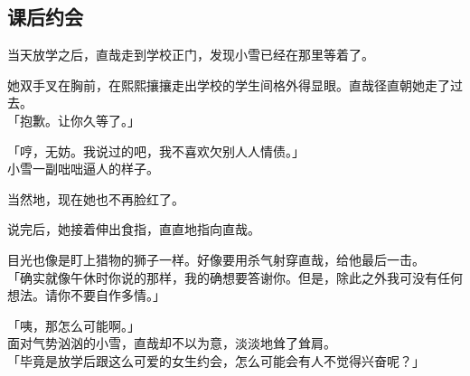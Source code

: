 \subsection{课后约会}

当天放学之后，直哉走到学校正门，发现小雪已经在那里等着了。

她双手叉在胸前，在熙熙攘攘走出学校的学生间格外得显眼。直哉径直朝她走了过去。\\

「抱歉。让你久等了。」

「哼，无妨。我说过的吧，我不喜欢欠别人人情债。」\\

小雪一副咄咄逼人的样子。

当然地，现在她也不再脸红了。

说完后，她接着伸出食指，直直地指向直哉。

目光也像是盯上猎物的狮子一样。好像要用杀气射穿直哉，给他最后一击。\\

「确实就像午休时你说的那样，我的确想要答谢你。但是，除此之外我可没有任何想法。请你不要自作多情。」

「咦，那怎么可能啊。」\\

面对气势汹汹的小雪，直哉却不以为意，淡淡地耸了耸肩。\\

「毕竟是放学后跟这么可爱的女生约会，怎么可能会有人不觉得兴奋呢？」

